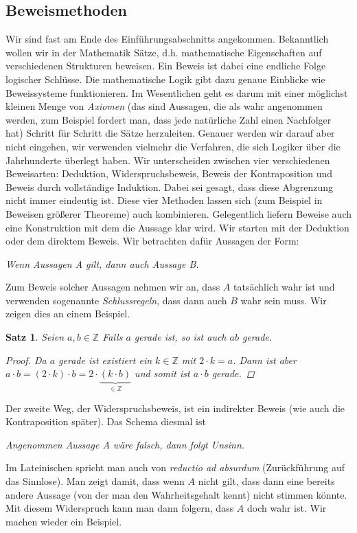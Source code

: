 \documentclass[11pt, a4paper]{article}
\theoremstyle{definition}
\theoremstyle{plain}
\newtheorem{theorem}[definition]{Satz}
\numberwithin{equation}{section}
\begin{document}
\subsection{Beweismethoden}\label{sec:pre_proofs}
Wir sind fast am Ende des Einführungsabschnitts angekommen. Bekanntlich wollen wir in der Mathematik Sätze, d.h. mathematische Eigenschaften auf verschiedenen Strukturen beweisen. Ein Beweis ist dabei eine endliche Folge logischer Schlüsse. Die mathematische Logik gibt dazu genaue Einblicke wie Beweissysteme funktionieren. Im Wesentlichen geht es darum mit einer möglichst kleinen Menge von \textit{Axiomen} (das sind Aussagen, die als wahr angenommen werden, zum Beispiel fordert man, dass jede natürliche Zahl einen Nachfolger hat) Schritt für Schritt die Sätze herzuleiten. Genauer werden wir darauf aber nicht eingehen, wir verwenden vielmehr die Verfahren, die sich Logiker über die Jahrhunderte überlegt haben. Wir unterscheiden zwischen vier verschiedenen Beweisarten: Deduktion, Widerspruchsbeweis, Beweis der Kontraposition und Beweis durch vollständige Induktion. Dabei sei gesagt, dass diese Abgrenzung nicht immer eindeutig ist. Diese vier Methoden lassen sich (zum Beispiel in Beweisen größerer Theoreme) auch kombinieren. Gelegentlich liefern Beweise auch eine Konstruktion mit dem die Aussage klar wird.
Wir starten mit der Deduktion oder dem direktem Beweis. Wir betrachten dafür Aussagen der Form: 
\begin{center}
	\textit{Wenn Aussagen A gilt, dann auch Aussage B.}
\end{center}
Zum Beweis solcher Aussagen nehmen wir an, dass $A$ tatsächlich wahr ist und verwenden sogenannte \textit{Schlussregeln}, dass dann auch $B$ wahr sein muss. Wir zeigen dies an einem Beispiel.
\begin{theorem}
	Seien $a, b \in \mathbb{Z}$ Falls $a$ gerade ist, so ist auch $ab$ gerade.
	\begin{proof}
		Da $a$ gerade ist existiert ein $k \in \mathbb{Z}$ mit $2 \cdot k = a$. Dann ist aber $a \cdot b = (2 \cdot k) \cdot b = 2 \cdot \underbrace{(k \cdot b)}_{\in \mathbb{Z}}$ und somit ist $a \cdot b$ gerade.
	\end{proof}
\end{theorem}
Der zweite Weg, der Widerspruchsbeweis, ist ein indirekter Beweis (wie auch die Kontraposition später). Das Schema diesmal ist
\begin{center}
	\textit{Angenommen Aussage A wäre falsch, dann folgt Unsinn.}
\end{center}
Im Lateinischen spricht man auch von \textit{reductio ad absurdum} (Zurückführung auf das Sinnlose). Man zeigt damit, dass wenn $A$ nicht gilt, dass dann eine bereits andere Aussage (von der man den Wahrheitsgehalt kennt) nicht stimmen könnte. Mit diesem Widerspruch kann man dann folgern, dass $A$ doch wahr ist. Wir machen wieder ein Beispiel.
\end{document}
